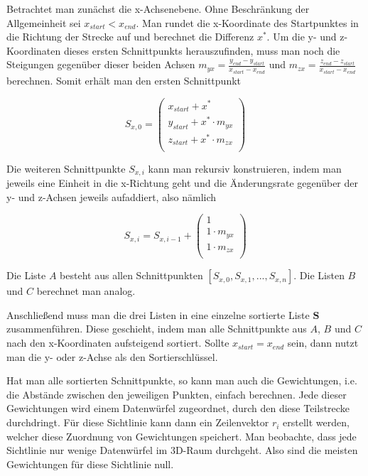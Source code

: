 \documentclass[]{dsadokumentation}
\begin{document}
Betrachtet man zunächst die x-Achsenebene. Ohne Beschränkung der Allgemeinheit sei $x_{start} < x_{end}$. Man rundet die x-Koordinate des Startpunktes in die Richtung der Strecke auf und berechnet die Differenz $x^{\ast}$. Um die y- und z-Koordinaten dieses ersten Schnittpunkts herauszufinden, muss man noch die Steigungen gegenüber dieser beiden Achsen $m_{yx} = \frac{y_{end} - y_{start}}{x_{start} - x_{end}}$ und $m_{zx} = \frac{z_{end} - z_{start}}{x_{start} - x_{end}}$ berechnen. Somit erhält man den ersten Schnittpunkt

\begin{equation}
  S_{x,0} = \begin{pmatrix}
    x_{start} + x^{\ast} \\
    y_{start} + x^{\ast} \cdot m_{yx} \\
    z_{start} + x^{\ast} \cdot m_{zx} \\
  \end{pmatrix}
\end{equation}

Die weiteren Schnittpunkte $S_{x,i}$ kann man rekursiv konstruieren, indem man jeweils eine Einheit in die x-Richtung geht und die Änderungsrate gegenüber der y- und z-Achsen jeweils aufaddiert, also nämlich

\begin{equation}
  S_{x,i} = S_{x,i-1} + \begin{pmatrix}
    1 \\
    1 \cdot m_{yx} \\
    1 \cdot m_{zx} \\
  \end{pmatrix}
\end{equation}

 Die Liste $A$ besteht aus allen Schnittpunkten $[S_{x,0}, S_{x,1}, ..., S_{x,n}]$. Die Listen $B$ und $C$ berechnet man analog.

Anschließend muss man die drei Listen in eine einzelne sortierte Liste $\mathbf{S}$ zusammenführen. Diese geschieht, indem man alle Schnittpunkte aus $A$, $B$ und $C$ nach den x-Koordinaten aufsteigend sortiert. Sollte $x_{start} = x_{end}$ sein, dann nutzt man die y- oder z-Achse als den Sortierschlüssel.

Hat man alle sortierten Schnittpunkte, so kann man auch die Gewichtungen, i.e. die Abstände zwischen den jeweiligen Punkten, einfach berechnen. Jede dieser Gewichtungen wird einem Datenwürfel zugeordnet, durch den diese Teilstrecke durchdringt. Für diese Sichtlinie kann dann ein Zeilenvektor $r_i$ erstellt werden, welcher diese Zuordnung von Gewichtungen speichert. Man beobachte, dass jede Sichtlinie nur wenige Datenwürfel im 3D-Raum durchgeht. Also sind die meisten Gewichtungen für diese Sichtlinie null.
\end{document}
